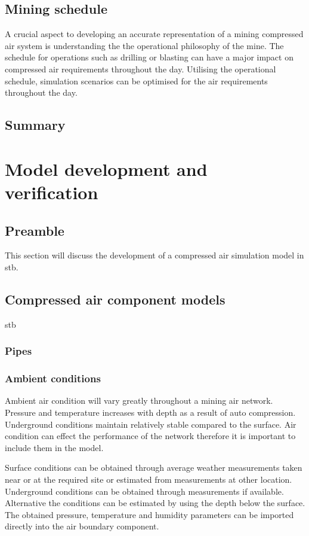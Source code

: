 	\subsection{Mining schedule}
		A crucial aspect to developing an accurate representation of a mining compressed air system is understanding the the operational philosophy of the mine. The schedule for operations such as drilling or blasting can have a major impact on compressed air requirements throughout the day. Utilising the operational schedule, simulation scenarios can be optimised for the air requirements throughout the day.
	\subsection{Summary}
\section{Model development and verification}
	\subsection{Preamble}
	This section will discuss the development of a compressed air simulation model in \gls{stb}.
	\subsection{Compressed air component models}
		\gls{stb} 
		\subsubsection{Pipes}
		\subsubsection{Ambient conditions}
		Ambient air condition will vary greatly throughout a mining air network. Pressure and temperature increases with depth  as a result of auto compression. Underground conditions maintain relatively stable compared to the surface. Air condition can effect the performance of the network therefore it is important to include them in the model.
		\par 
		Surface conditions can be obtained through average weather measurements taken near or at the required site or estimated from measurements at other location. Underground conditions can be obtained through measurements if available. Alternative the conditions can be estimated by using the depth below the surface. The obtained pressure, temperature and humidity parameters can be imported directly into the air boundary component.
